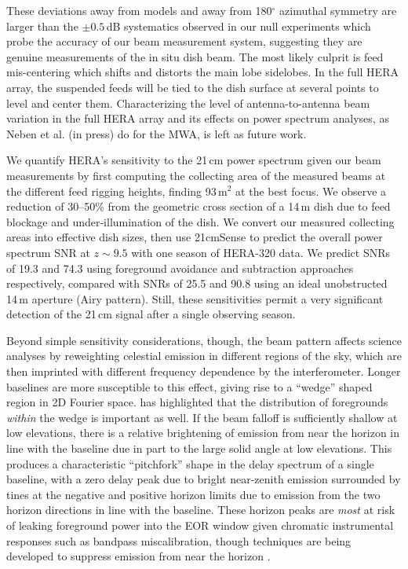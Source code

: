 \documentclass{emulateapj}
\begin{document}
These deviations away from models and away from 180$^\circ$ azimuthal symmetry are larger than the $\pm0.5$\,dB systematics observed in our null experiments which probe the accuracy of our beam measurement system, suggesting they are genuine measurements of the in situ dish beam. The most likely culprit is feed mis-centering which shifts and distorts the main lobe sidelobes. In the full HERA array, the suspended feeds will be tied to the dish surface at several points to level and center them. Characterizing the level of antenna-to-antenna beam variation in the full HERA array and its effects on power spectrum analyses, as Neben et al. (in press) do for the MWA, is left as future work.

We quantify HERA's sensitivity to the 21\,cm power spectrum given our beam measurements by first computing the collecting area of the measured beams at the different feed rigging heights, finding 93\,m$^2$ at the best focus. We observe a reduction of 30--50\% from the geometric cross section of a 14\,m dish due to feed blockage and under-illumination of the dish. We convert our measured collecting areas into effective dish sizes, then use 21cmSense to predict the overall power spectrum SNR at $z\sim9.5$ with one season of HERA-320 data. We predict SNRs of 19.3 and 74.3 using foreground avoidance and subtraction approaches respectively, compared with SNRs of 25.5 and 90.8 using an ideal unobstructed 14\,m aperture (Airy pattern). Still, these sensitivities permit a very significant detection of the 21\,cm signal after a single observing season.

Beyond simple sensitivity considerations, though, the beam pattern affects science analyses by reweighting celestial emission in different regions of the sky, which are then imprinted with different frequency dependence by the interferometer. Longer baselines are more susceptible to this effect, giving rise to a ``wedge'' shaped region in 2D Fourier space. \citet{nithya15} has highlighted that the distribution of foregrounds \textit{within} the wedge is important as well. If the beam falloff is sufficiently shallow at low elevations, there is a relative brightening of emission from near the horizon in line with the baseline due in part to the large solid angle at low elevations. This produces a characteristic ``pitchfork'' shape in the delay spectrum of a single baseline, with a zero delay peak due to bright near-zenith emission surrounded by tines at the negative and positive horizon limits due to emission from the two horizon directions in line with the baseline. These horizon peaks are \textit{most} at risk of leaking foreground power into the EOR window given chromatic instrumental responses such as bandpass miscalibration, though techniques are being developed to suppress emission from near the horizon \citep{parsonsoptimalfringeratefiltering}.
\end{document}
